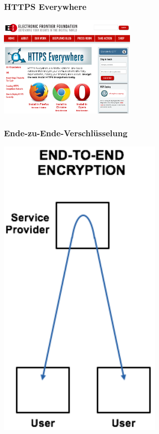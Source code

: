 \documentclass[12pt]{beamer}
\begin{document}
\begin{frame}
  \frametitle{HTTPS Everywhere}
    \begin{center}
      \includegraphics[height=5cm]{img/https-everywhere.png}
    \end{center}
\end{frame}

\begin{frame}
    \frametitle{Ende-zu-Ende-Verschlüsselung}
    \begin{center}
      \includegraphics[height=0.8\textheight]{img/enc-e2e.png}
    \end{center}
\end{frame}
\end{document}
